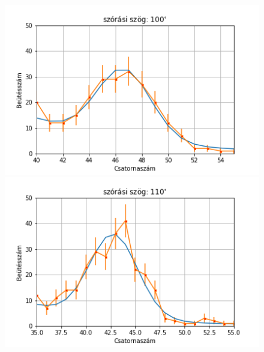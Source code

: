 \documentclass[a4paper,12pt]{article}
\begin{document}
\begin{figure}[!htb]
\begin{minipage}{.49\textwidth}
    \end{minipage}
    \begin{minipage}{.49\textwidth}
        \centering
        \includegraphics[width=1.\linewidth]{../plots/withbackground/100_1113fit.png}
    \end{minipage}
    \begin{minipage}{.49\textwidth}
        \centering
        \includegraphics[width=1.\linewidth]{../plots/withbackground/110_1098fit.png}
    \end{minipage}
\end{figure}	
\end{document}
